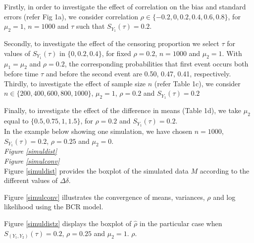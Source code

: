 \documentclass[twoside,a4paper,12pt]{article}
\renewcommand{\hat}{\widehat}
\theoremstyle{plain}
\theoremstyle{definition}
\begin{document}
Firstly, in order to investigate the effect of correlation on the bias and standard 
errors (refer Fig 1a), we consider  correlation $\rho \in \{-0.2, 0, 0.2, 0.4, 0.6, 
0.8\}$, for $\mu_{2}=1$, $n=1000$ and $\tau$ such that $S_{Y_1}(\tau)=0.2$. 

Secondly, to investigate the effect of the censoring proportion 
we select $\tau$ for values of $S_{Y_1}(\tau)$ in $\{0, 0.2, 0.4\}$, 
for fixed $\rho=0.2$, $n=1000$ and $\mu_{2}=1$. 
With $\mu_1=\mu_2$ and $\rho=0.2$, the corresponding probabilities that first event occurs both before time $\tau$ and 
before the second event  are 0.50, 0.47, 0.41, respectively. 
Thirdly, to investigate the effect of sample size $n$ (refer Table 1c), we consider $n \in \{200, 400, 600, 800, 1000\}$, $\mu_{2}=1$, $\rho=0.2$ and  $S_{Y_1}(\tau)=0.2$

Finally, to investigate the effect of the difference in means (Table 1d), we take $\mu_{2}$ 
equal to $\{0.5, 0.75, 1, 1.5\}$, for $\rho=0.2$ and $S_{Y_1}(\tau)=0.2$. \\

In the example below showing one simulation, we have chosen $n=1000$, 
$S_{Y_1}(\tau)=0.2$, $\rho=0.25$ and $\mu_2=0$.\\

\noindent \textit{Figure \ref{simuldist}}\\ %
\textit{Figure \ref{simulconv}}\\ %

Figure \ref{simuldist} provides the boxplot of the simulated data $M$ according 
to the different values of $\Delta\delta$. 

Figure \ref{simulconv} illustrates the convergence of means, variances, $\rho$ 
and log likelihood using the BCR model. 

Figure \ref{simuldistz} %
displays the boxplot of $\hat{\rho}$ in the particular case when 
$S_{(Y_1,Y_2)}(\tau)=0.2$, $\rho=0.25$ and $\mu_2=1$. 
$\rho$.\\
\end{document}
